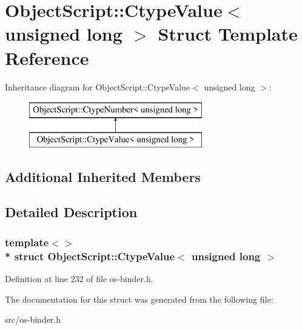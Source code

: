 \hypertarget{struct_object_script_1_1_ctype_value_3_01unsigned_01long_01_4}{}\section{Object\+Script\+:\+:Ctype\+Value$<$ unsigned long $>$ Struct Template Reference}
\label{struct_object_script_1_1_ctype_value_3_01unsigned_01long_01_4}
Inheritance diagram for Object\+Script\+:\+:Ctype\+Value$<$ unsigned long $>$\+:\begin{figure}[H]
\begin{center}
\leavevmode
\includegraphics[height=2.000000cm]{struct_object_script_1_1_ctype_value_3_01unsigned_01long_01_4}
\end{center}
\end{figure}
\subsection*{Additional Inherited Members}


\subsection{Detailed Description}
\subsubsection*{template$<$$>$\\*
struct Object\+Script\+::\+Ctype\+Value$<$ unsigned long $>$}



Definition at line 232 of file os-\/binder.\+h.



The documentation for this struct was generated from the following file\+:\begin{DoxyCompactItemize}
\item 
src/os-\/binder.\+h\end{DoxyCompactItemize}
